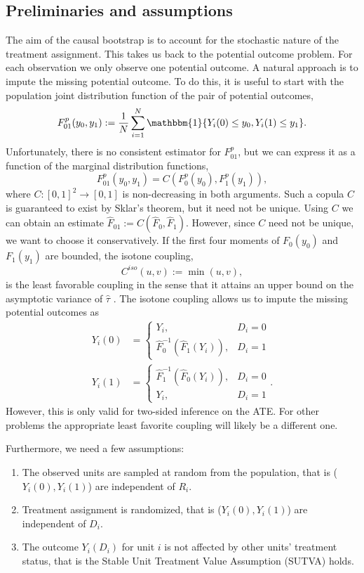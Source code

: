 \documentclass[aodsor,preprint]{imsart}
\numberwithin{equation}{section}
\theoremstyle{plain}
\newcommand{\ind}{\mathbbm{1}} %
\begin{document}
\subsection{Preliminaries and assumptions}
The aim of the causal bootstrap is to account for the stochastic nature of the treatment assignment. This takes us back to the potential outcome problem. For each observation we only observe one potential outcome. A natural approach is to impute the missing potential outcome. To do this, it is useful to start with the population joint distribution function of the pair of potential outcomes,
$$
F_{01}^p (y_0, y_1) := \frac{1}{N} \sum_{i = 1}^{N} \ind\{Y_i(0) \leq y_0, Y_i(1) \leq y_1\}.
$$
Unfortunately, there is no consistent estimator for $F_{01}^p$, but we can express it as a function of the marginal distribution functions,
$$
F_{01}^p (y_0, y_1) = C(F_0^p(y_0), F_1^p(y_1)),
$$
where $C: [0, 1]^2 \to [0, 1]$ is non-decreasing in both arguments. Such a copula $C$ is guaranteed to exist by Sklar's theorem, but it need not be unique. Using $C$ we can obtain an estimate $\widehat{F}_{01} := C(\widehat{F}_0, \widehat{F}_1)$. However, since $C$ need not be unique, we want to choose it conservatively. If the first four moments of $F_0(y_0)$ and $F_1(y_1)$ are bounded, the isotone coupling,
$$
C^{iso}(u, v) := \min(u, v),
$$
is the least favorable coupling in the sense that it attains an upper bound on the asymptotic variance of $\widehat{\tau}$ \citep[][sections 2.4 and 2.5]{Imbens_2021}. The isotone coupling allows us to impute the missing potential outcomes as
\begin{align} \label{imputation1}
	Y_i(0) &= \begin{cases}
		Y_i, & D_i = 0 \\
		\widehat{F}_0^{-1}(\widehat{F}_1(Y_i)), & D_i = 1
	\end{cases} \\
	\label{imputation2}
	Y_i(1) &= \begin{cases}
		\widehat{F}_1^{-1}(\widehat{F}_0(Y_i)), & D_i = 0 \\
		Y_i, & D_i = 1
	\end{cases}.
\end{align}
However, this is only valid for two-sided inference on the ATE. For other problems the appropriate least favorite coupling will likely be a different one.

Furthermore, we need a few assumptions:
\begin{enumerate}
	\item The observed units are sampled at random from the population, that is ($Y_i(0), Y_i(1)$) are independent of $R_i$.
	\item Treatment assignment is randomized, that is ($Y_i(0), Y_i(1)$) are independent of $D_i$.
	\item The outcome $Y_i(D_i)$ for unit $i$ is not affected by other units' treatment status, that is the Stable Unit Treatment Value Assumption (SUTVA) holds.
\end{enumerate}
\end{document}
